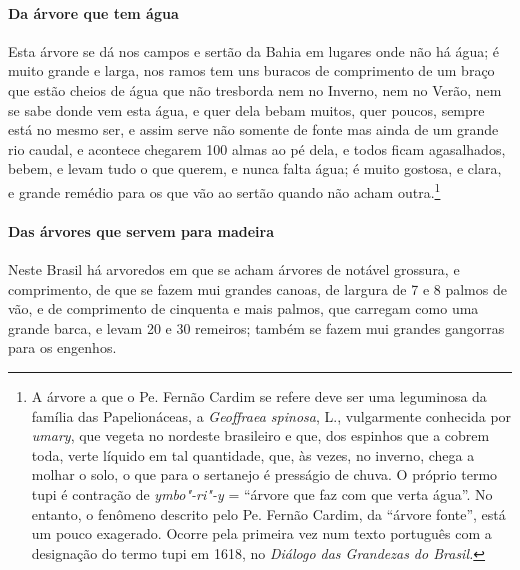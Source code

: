 \begin{linenumbers}
\paragraph{Da árvore que tem água}\quad
Esta árvore se dá nos campos e sertão da Bahia em lugares
onde não há água; é muito grande e larga, nos ramos tem uns buracos de
comprimento de um braço que estão cheios de água que não tresborda nem
no Inverno, nem no Verão, nem se sabe donde vem esta água, e quer dela
bebam muitos, quer poucos, sempre está no mesmo ser, e assim serve
não somente de fonte mas ainda de um grande rio caudal, e acontece
chegarem 100 almas ao pé dela, e todos ficam agasalhados, bebem, e
levam tudo o que querem, e nunca falta água; é muito gostosa, e clara,
e grande remédio para os que vão ao sertão quando não acham
outra.\footnote{ A árvore a que o Pe. Fernão Cardim se refere deve ser
uma leguminosa da família das Papelionáceas, a \textit{Geoffraea
spinosa}, L., vulgarmente conhecida por \textit{umary}, que vegeta no
nordeste brasileiro e que, dos espinhos que a cobrem toda, verte
líquido em tal quantidade, que, às vezes, no inverno, chega a molhar o
solo, o que para o sertanejo é presságio de chuva. O próprio termo tupi
é contração de \textit{ymbo"-ri"-y} = ``árvore que faz com que verta
água''. No entanto, o fenômeno descrito pelo Pe. Fernão Cardim, da
``árvore fonte'', está um pouco exagerado. Ocorre pela primeira vez num
texto português com a designação do termo tupi em 1618, no
\textit{Diálogo das Grandezas do Brasil.}} 


\paragraph{Das árvores que servem para madeira}\quad
Neste Brasil há arvoredos em que se acham árvores de notável
grossura, e comprimento, de que se fazem mui grandes canoas, de largura
de 7 e 8 palmos de vão, e de comprimento de cinquenta e mais palmos,
que carregam como uma grande barca, e levam 20 e 30 remeiros; também se
fazem mui grandes gangorras para os engenhos.


\end{linenumbers}
